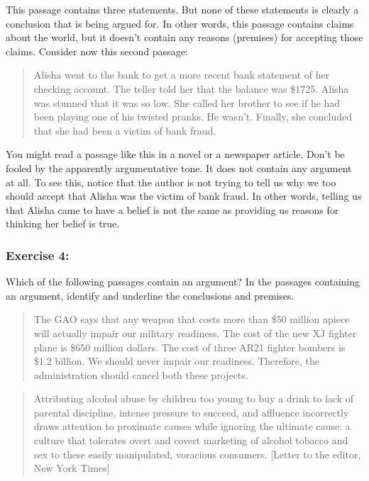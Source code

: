 \documentclass[]{article}
\begin{document}
This passage contains three statements. But none of these statements is
clearly a conclusion that is being argued for. In other words, this
passage contains claims about the world, but it doesn't contain any
reasons (premises) for accepting those claims. Consider now this second
passage:

\begin{quote}
Alisha went to the bank to get a more recent bank statement of her
checking account. The teller told her that the balance was \$1725.
Alisha was stunned that it was so low. She called her brother to see if
he had been playing one of his twisted pranks. He wasn't. Finally, she
concluded that she had been a victim of bank fraud.
\end{quote}

You might read a passage like this in a novel or a newspaper article.
Don't be fooled by the apparently argumentative tone. It does not
contain any argument at all. To see this, notice that the author is not
trying to tell us why we too should accept that Alisha was the victim of
bank fraud. In other words, telling us that Alisha came to have a belief
is not the same as providing us reasons for thinking her belief is true.

\subsubsection{Exercise 4:}\label{exercise-4}

Which of the following passages contain an argument? In the passages
containing an argument, identify and underline the conclusions and
premises.

\begin{quote}
The GAO says that any weapon that costs more than \$50 million apiece
will actually impair our military readiness. The cost of the new XJ
fighter plane is \$650 million dollars. The cost of three AR21 fighter
bombers is \$1.2 billion. We should never impair our readiness.
Therefore, the administration should cancel both these projects.
\end{quote}

\begin{quote}
Attributing alcohol abuse by children too young to buy a drink to lack
of parental discipline, intense pressure to succeed, and affluence
incorrectly draws attention to proximate causes while ignoring the
ultimate cause: a culture that tolerates overt and covert marketing of
alcohol tobacco and sex to these easily manipulated, voracious
consumers. {[}Letter to the editor, New York Times{]}
\end{quote}
\end{document}
